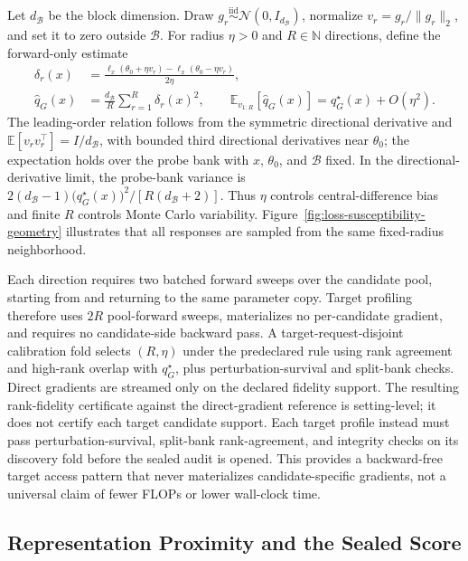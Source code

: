 Let $d_{\mathcal B}$ be the block dimension. Draw
$g_r\overset{\mathrm{iid}}{\sim}\mathcal N(0,I_{d_{\mathcal B}})$, normalize
$v_r=g_r/\|g_r\|_2$, and set it to zero outside $\mathcal B$. For radius
$\eta>0$ and $R\in\mathbb N$ directions, define the forward-only estimate
\begin{equation}
\begin{aligned}
  \delta_r(x)
  &=
  \frac{\ell_x(\theta_0+\eta v_r)-\ell_x(\theta_0-\eta v_r)}
       {2\eta},\\
  \widehat q_G(x)
  &=
  \frac{d_{\mathcal B}}{R}\sum_{r=1}^{R}\delta_r(x)^2,
  \qquad
  \mathbb E_{v_{1:R}}[\widehat q_G(x)]
  =q_G^\star(x)+O(\eta^2).
\end{aligned}
\label{eq:loss-susceptibility-estimator}
\end{equation}
The leading-order relation follows from the symmetric directional derivative
and $\mathbb E[v_rv_r^\top]=I/d_{\mathcal B}$, with bounded third directional
derivatives near $\theta_0$; the expectation holds over the probe bank with
$x$, $\theta_0$, and $\mathcal B$ fixed. In the directional-derivative limit,
the probe-bank variance is
$2(d_{\mathcal B}-1)\bigl(q_G^\star(x)\bigr)^2/[R(d_{\mathcal B}+2)]$.
Thus $\eta$ controls central-difference bias and finite $R$ controls
Monte Carlo variability. Figure~\ref{fig:loss-susceptibility-geometry}
illustrates that all responses are sampled from the same fixed-radius
neighborhood.

Each direction requires two batched forward sweeps over the candidate pool,
starting from and returning to the same parameter copy. Target profiling
therefore uses $2R$ pool-forward sweeps, materializes no per-candidate
gradient, and requires no candidate-side backward pass. A
target-request-disjoint calibration fold selects $(R,\eta)$ under the
predeclared rule using rank agreement and high-rank overlap with $q_G^\star$,
plus perturbation-survival and split-bank checks. Direct gradients
are streamed only on the declared fidelity support. The resulting rank-fidelity
certificate against the direct-gradient reference is setting-level; it does
not certify each target candidate support. Each target profile instead must
pass perturbation-survival, split-bank rank-agreement, and integrity checks on
its discovery fold before
the sealed audit is opened. This provides a backward-free target access pattern
that never materializes candidate-specific gradients, not a universal claim
of fewer FLOPs or lower wall-clock time.

\subsection{Representation Proximity and the Sealed Score}
\label{sec:method-representation}
\label{sec:method-mixture}
\label{sec:method-channels}

